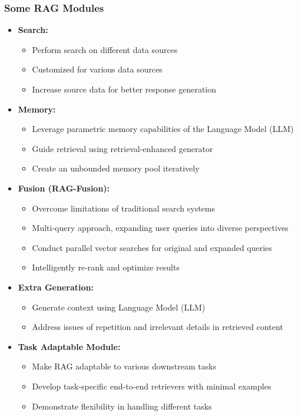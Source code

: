 \begin{frame}[fragile]\frametitle{Some RAG Modules}

  \begin{itemize}
    \item \textbf{Search:}
          \begin{itemize}
              \item Perform search on different data sources
              \item Customized for various data sources
              \item Increase source data for better response generation
          \end{itemize}
    \item \textbf{Memory:}
          \begin{itemize}
              \item Leverage parametric memory capabilities of the Language Model (LLM)
              \item Guide retrieval using retrieval-enhanced generator
              \item Create an unbounded memory pool iteratively
          \end{itemize}
    \item \textbf{Fusion (RAG-Fusion):}
          \begin{itemize}
              \item Overcome limitations of traditional search systems
              \item Multi-query approach, expanding user queries into diverse perspectives
              \item Conduct parallel vector searches for original and expanded queries
              \item Intelligently re-rank and optimize results
          \end{itemize}
    \item \textbf{Extra Generation:}
          \begin{itemize}
              \item Generate context using Language Model (LLM)
              \item Address issues of repetition and irrelevant details in retrieved content
          \end{itemize}
    \item \textbf{Task Adaptable Module:}
          \begin{itemize}
              \item Make RAG adaptable to various downstream tasks
              \item Develop task-specific end-to-end retrievers with minimal examples
              \item Demonstrate flexibility in handling different tasks
          \end{itemize}
  \end{itemize}

\end{frame}

